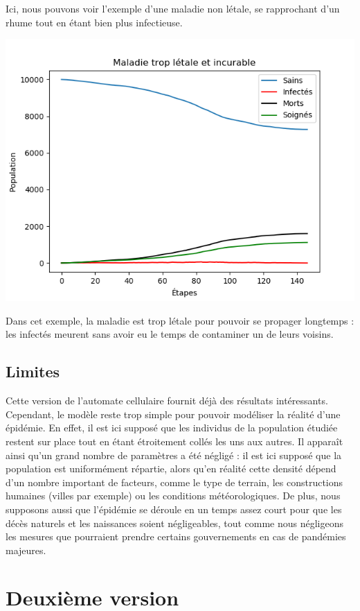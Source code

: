 \documentclass{article}
\begin{document}
	Ici, nous pouvons voir l'exemple d'une maladie non létale, se rapprochant d'un rhume tout en étant bien plus infectieuse.


\includegraphics[scale=1]{../images/Figure_3.png}



Dans cet exemple, la maladie est trop létale pour pouvoir se propager longtemps : les infectés meurent sans avoir eu le temps de contaminer un de leurs voisins.
\subsection{Limites}
	Cette version de l'automate cellulaire fournit déjà des résultats intéressants. Cependant, le modèle reste trop simple pour pouvoir modéliser la réalité d'une épidémie. En effet, il est ici supposé que les individus de la population étudiée restent sur place tout en étant étroitement collés les uns aux autres.
Il apparaît ainsi qu'un grand nombre de paramètres a été négligé : il est ici supposé que la population est uniformément répartie, alors qu'en réalité cette densité dépend d'un nombre important de facteurs, comme le type de terrain, les constructions humaines (villes par exemple) ou les conditions météorologiques. De plus, nous supposons aussi que l'épidémie se déroule en un temps assez court pour que les décès naturels et les naissances soient négligeables, tout comme nous négligeons les mesures que pourraient prendre certains gouvernements en cas de pandémies majeures.
	
	
	
\section{Deuxième version}
\end{document}
